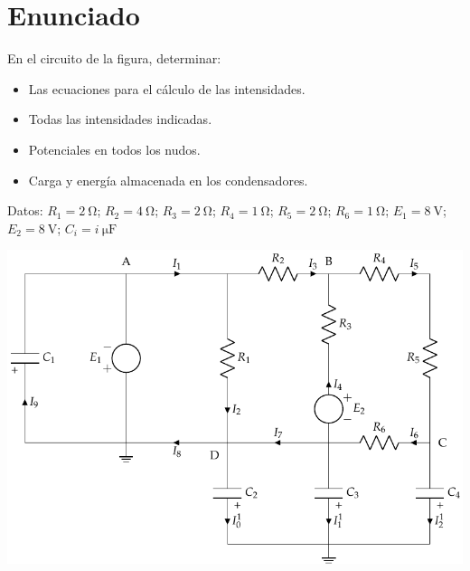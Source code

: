 \section{Enunciado}
En el circuito de la figura, determinar:
\begin{itemize}
\item Las ecuaciones para el cálculo de las intensidades.
\item Todas las intensidades indicadas.
\item Potenciales en todos los nudos.
\item Carga y energía almacenada en los condensadores.
\end{itemize}

\vspace{2mm}
  Datos: $R_1 = \qty{2}{\ohm}$; $R_2 = \qty{4}{\ohm}$; $R_3 = \qty{2}{\ohm}$; $R_4 = \qty{1}{\ohm}$; $R_5 = \qty{2}{\ohm}$; $R_6 = \qty{1}{\ohm}$; $E_1 = \qty{8}{\volt}$; $E_2 = \qty{8}{\volt}$; $C_i = \qty[parse-numbers=false]{i}{\micro\farad}$

\begin{center}
  \includegraphics{figuras/BT1_11.pdf}
\end{center}

